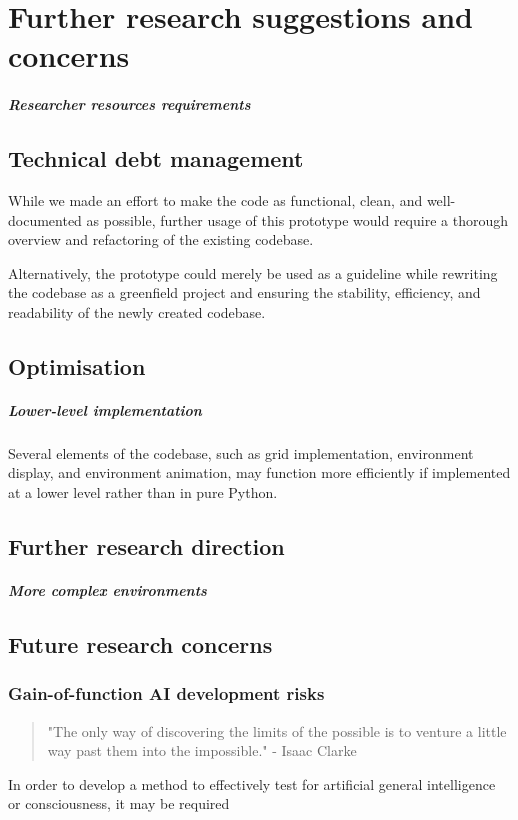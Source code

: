 \documentclass[masterthesis]{fer}
\begin{document}
\chapter{Further research suggestions and concerns}

\label{sec:further_research_suggestions}
\paragraph{Researcher resources requirements}
\section{Technical debt management}
While we made an effort to make the code as functional, clean, and well-documented as possible,
further usage of this prototype would require a thorough overview and refactoring of the existing codebase.

Alternatively, the prototype could merely be used as a guideline while rewriting the codebase as a greenfield project and ensuring the stability, efficiency, and readability of the newly created codebase.
\section{Optimisation}
\paragraph{Lower-level implementation}
Several elements of the codebase, such as grid implementation, environment display, and environment animation,
may function more efficiently if implemented at a lower level rather than in pure Python.
\section{Further research direction}
\paragraph{More complex environments}
\section{Future research concerns}
\subsection{Gain-of-function AI development risks}
\begin{quote}
"The only way of discovering the limits of the possible is to venture a little way past them into the impossible." - Isaac Clarke
\end{quote}
In order to develop a method to effectively test for artificial general intelligence or consciousness, it may be required  
\end{document}
